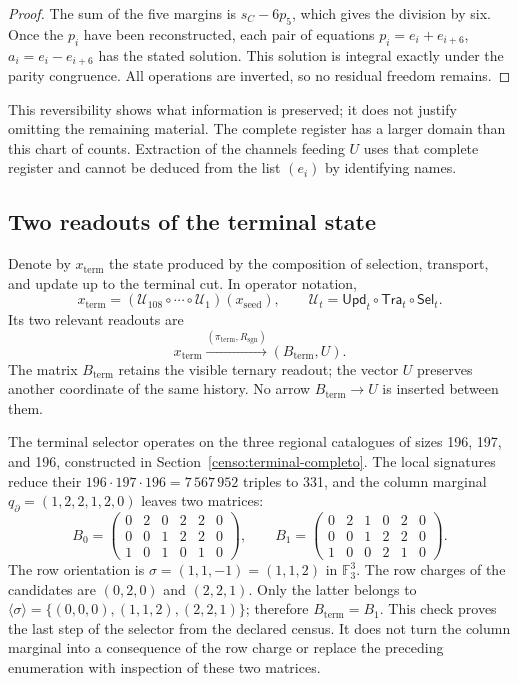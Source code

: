 \begin{proof}
The sum of the five margins is \(s_C-6p_5\), which gives the
division by six. Once the \(p_i\) have been reconstructed, each pair of equations
\(p_i=e_i+e_{i+6}\), \(a_i=e_i-e_{i+6}\) has the stated solution.
This solution is integral exactly under the parity congruence. All
operations are inverted, so no residual freedom remains.
\end{proof}

This reversibility shows what information is preserved; it does not justify
omitting the remaining material. The complete register has a larger domain
than this chart of counts. Extraction of the channels feeding
\(U\) uses that complete register and cannot be deduced from the list
\((e_i)\) by identifying names.




\subsection{Two readouts of the terminal state}
\label{subsec:k-terminal}

Denote by \(x_{\mathrm{term}}\) the state produced by the composition
of selection, transport, and update up to the terminal cut. In
operator notation,
\[
 x_{\mathrm{term}}=
 (\mathcal U_{108}\circ\cdots\circ\mathcal U_1)(x_{\mathrm{seed}}),
 \qquad \mathcal U_t=\mathsf{Upd}_t\circ\mathsf{Tra}_t\circ\mathsf{Sel}_t.
\]
Its two relevant readouts are
\[
 x_{\mathrm{term}}
 \xrightarrow{(\pi_{\mathrm{term}},R_{\mathrm{sgn}})}
 (B_{\mathrm{term}},U).
\]
The matrix \(B_{\mathrm{term}}\) retains the visible ternary readout; the
vector \(U\) preserves another coordinate of the same history. No arrow
\(B_{\mathrm{term}}\to U\) is inserted between them.

The terminal selector operates on the three regional catalogues
of sizes 196, 197, and 196, constructed in
Section~\ref{censo:terminal-completo}. The local signatures reduce their
\(196\cdot197\cdot196=7\,567\,952\) triples to 331, and the column
marginal \(q_{\partial}=(1,2,2,1,2,0)\) leaves two matrices:
\[
 B_0=\begin{pmatrix}0&2&0&2&2&0\\0&0&1&2&2&0\\1&0&1&0&1&0\end{pmatrix},
 \qquad
 B_1=\begin{pmatrix}0&2&1&0&2&0\\0&0&1&2&2&0\\1&0&0&2&1&0\end{pmatrix}.
\]
The row orientation is \(\sigma=(1,1,-1)=(1,1,2)\) in
\(\mathbb F_3^3\). The row charges of the candidates are
\((0,2,0)\) and \((2,2,1)\). Only the latter belongs to
\(\langle\sigma\rangle=\{(0,0,0),(1,1,2),(2,2,1)\}\); therefore
\(B_{\mathrm{term}}=B_1\). This check proves the last step of the
selector from the declared census. It does not turn the column marginal
into a consequence of the row charge or replace the preceding enumeration
with inspection of these two matrices.

